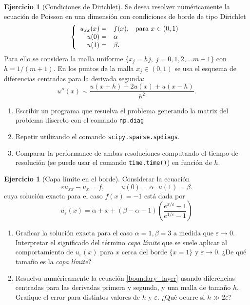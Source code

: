 \documentclass[12pt, a4paper]{amsbook}
\theoremstyle{remark}
\theoremstyle{definition}
\newtheorem{ejer}[teo]{Ejercicio}
\numberwithin{section}{chapter}
\numberwithin{subsection}{section}
\numberwithin{equation}{section}
\numberwithin{figure}{chapter}
\begin{document}
\begin{ejer}[Condiciones de Dirichlet] \label{ejer_dirichlet}
Se desea resolver numéricamente la ecuación de Poisson en una dimensión con
condiciones de borde de tipo Dirichlet
\begin{equation}
\label{laplaciano_dirichlet}
\left\lbrace
  \begin{array}{r l c}
      u_{xx}(x) = & f(x), & \mbox{para } x \in (0,1) \\
      u(0) = & \alpha & \\
      u(1) = & \beta. &
      \end{array}
    \right.
\end{equation}
Para ello se considera la malla uniforme $\{ x_j = hj, \; j=0,1,2,\dots m+1 \}$ con $h=1/(m+1)$.
En los puntos de la malla $x_j \in (0,1)$ se usa el esquema de diferencias centradas para
la derivada segunda:
\[
u''(x) \sim \frac{u(x+h)-2u(x)+u(x-h)}{h^2}.
\]
\begin{enumerate}[label=(\alph*)]
 \item Escribir un programa que resuelva el problema generando la matriz del problema discreto con el comando \lstinline{np.diag}
 \item Repetir utilizando el comando \lstinline{scipy.sparse.spdiags}. 
 \item Comparar la performance de ambas resoluciones computando el tiempo de resolución (se puede usar el comando \lstinline{time.time()}) en función de $h$.
\end{enumerate}
\end{ejer}

\begin{ejer}[Capa límite en el borde] \label{ejer_boundary_layer}
Considerar la ecuación
\begin{equation}
\label{boundary_layer}
 \varepsilon u_{xx} - u_{x} = f, \hspace{1cm} u(0)=\alpha \ \ \ u(1)=\beta.
\end{equation}
cuya solución exacta para el caso $f(x) = -1$ está dada por
$$ u_{\varepsilon}(x) = \alpha + x + (\beta - \alpha -1) \left( \frac{e^{x/\varepsilon}-1 }{e^{1/\varepsilon}-1} \right)$$

\begin{enumerate}[label=(\alph*)]
\item Graficar la solución exacta para el caso $\alpha=1,\beta=3$ a medida que $\varepsilon \to 0$.
Interpretar el significado del término \textit{capa límite} que se suele aplicar al comportamiento
de $u_\varepsilon(x)$ para $x$ cerca del borde $\{ x=1 \}$ y $\varepsilon \to 0$.
¿De qué tamaño es la \textit{capa límite}?
\item Resuelva numéricamente la ecuación \eqref{boundary_layer} usando diferencias centradas para las
derivadas primera y segunda, y una malla de tamaño $h$. Grafique el error para distintos valores de $h$ y $\varepsilon$.
¿Qué ocurre si $h\gg2\varepsilon$?
\end{enumerate}
\end{ejer}
\end{document}
